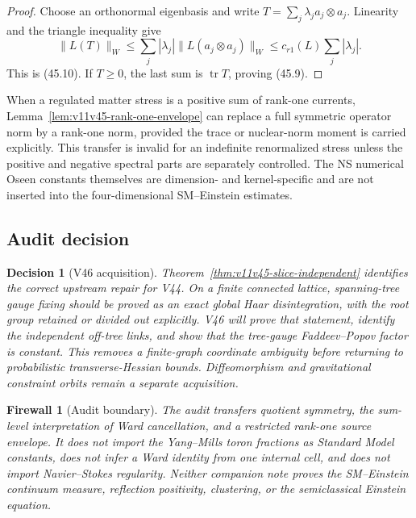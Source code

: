 \documentclass[11pt]{article}
\newtheorem{firewall}[theorem]{Firewall}
\newtheorem{decision}[theorem]{Decision}
\begin{document}
\begin{proof}
Choose an orthonormal eigenbasis and write
\(T=\sum_j\lambda_j a_j\otimes a_j\).  Linearity and the triangle
inequality give
\[
 \lVert L(T)\rVert_W
 \le\sum_j|\lambda_j|
       \lVert L(a_j\otimes a_j)\rVert_W
 \le c_{r1}(L)\sum_j|\lambda_j|.
\]
This is (45.10).  If \(T\ge0\), the last sum is
\(\operatorname{tr}T\), proving (45.9).
\end{proof}

\begin{transfer}
\label{trans:v11v45-rank-one}
When a regulated matter stress is a positive sum of rank-one currents,
Lemma~\ref{lem:v11v45-rank-one-envelope} can replace a full symmetric
operator norm by a rank-one norm, provided the trace or nuclear-norm
moment is carried explicitly.  This transfer is invalid for an
indefinite renormalized stress unless the positive and negative
spectral parts are separately controlled.  The NS numerical Oseen
constants themselves are dimension- and kernel-specific and are not
inserted into the four-dimensional SM--Einstein estimates.
\end{transfer}

\subsection{Audit decision}

\begin{decision}[V46 acquisition]
\label{dec:v11v45-next}
Theorem~\ref{thm:v11v45-slice-independent} identifies the correct
upstream repair for V44.  On a finite connected lattice, spanning-tree
gauge fixing should be proved as an exact global Haar
disintegration, with the root group retained or divided out
explicitly.  V46 will prove that statement, identify the independent
off-tree links, and show that the tree-gauge Faddeev--Popov factor is
constant.  This removes a finite-graph coordinate ambiguity before
returning to probabilistic transverse-Hessian bounds.  Diffeomorphism
and gravitational constraint orbits remain a separate acquisition.
\end{decision}

\begin{firewall}[Audit boundary]
\label{fire:v11v45-boundary}
The audit transfers quotient symmetry, the sum-level interpretation of
Ward cancellation, and a restricted rank-one source envelope.  It does
not import the Yang--Mills toron fractions as Standard Model constants,
does not infer a Ward identity from one internal cell, and does not
import Navier--Stokes regularity.  Neither companion note proves the
SM--Einstein continuum measure, reflection positivity, clustering, or
the semiclassical Einstein equation.
\end{firewall}
\end{document}
